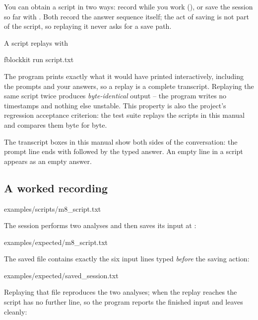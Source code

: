 You can obtain a script in two ways: record while you work
(), or save the session so far with . Both record
the answer sequence itself; the act of saving is not part of the script, so
replaying it never asks for a save path.

A script replays with

\begin{codeblock}
fblockkit run script.txt
\end{codeblock}

The program prints exactly what it would have printed interactively, including
the prompts and your answers, so a replay is a complete transcript. Replaying
the same script twice produces \emph{byte-identical} output -- the program
writes no timestamps and nothing else unstable. This property is also the
project's regression acceptance criterion: the test suite replays the scripts
in this manual and compares them byte for byte.

\begin{notebox}
The transcript boxes in this manual show both sides of the conversation: the
prompt line ends with \code{>} followed by the typed answer. An empty line in
a script appears as an empty answer.
\end{notebox}

\subsection{A worked recording}


  {examples/scripts/m8_script.txt}

The session performs two analyses and then saves its input at :


  {examples/expected/m8_script.txt}

The saved file contains exactly the six input lines typed \emph{before} the
saving action:


  {examples/expected/saved_session.txt}

Replaying that file reproduces the two analyses; when the replay reaches
 the script has no further line, so the program reports the finished
input and leaves cleanly:

